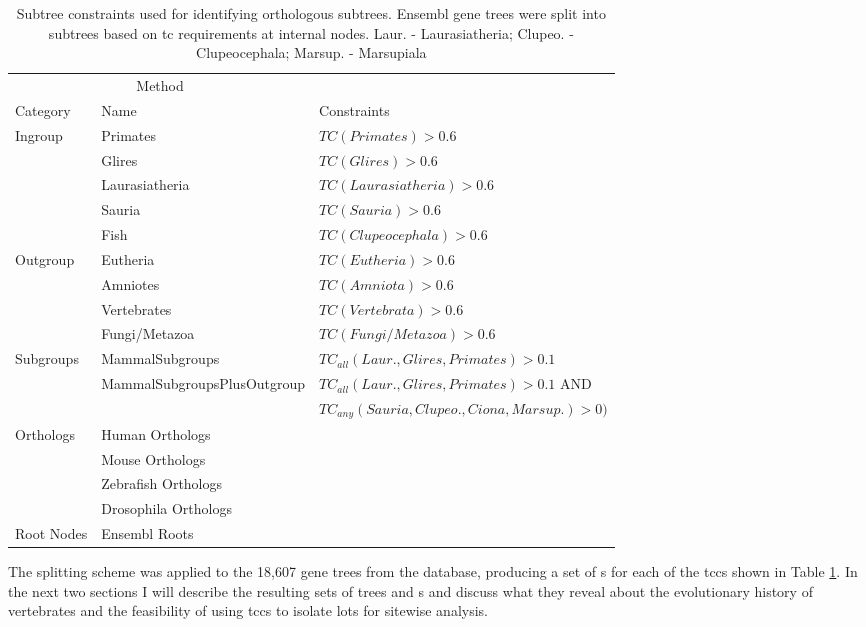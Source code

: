 \begin{table} \footnotesize
\centering
\begin{tabular}{@{}lll@{}} \toprule
\multicolumn{2}{c}{Method} \\ \cmidrule(r){1-2}
   Category & Name & Constraints \\ \midrule
Ingroup & Primates & $TC(Primates) > 0.6$ \\
 &   Glires &  $TC(Glires) > 0.6$ \\
 &   Laurasiatheria & $TC(Laurasiatheria) > 0.6$ \\
 &   Sauria & $TC(Sauria) > 0.6$ \\
 &   Fish & $TC(Clupeocephala) > 0.6$ \\
Outgroup &  Eutheria & $TC(Eutheria) > 0.6$ \\
 &   Amniotes & $TC(Amniota) > 0.6$\\
 &   Vertebrates & $TC(Vertebrata) > 0.6$\\
 &   Fungi/Metazoa & $TC(Fungi/Metazoa) > 0.6$\\
Subgroups &  MammalSubgroups & $TC_{all}(Laur., Glires, Primates) > 0.1$\\
 &   \scriptsize{MammalSubgroupsPlusOutgroup} & $TC_{all}(Laur., Glires, Primates) > 0.1$ AND \\
 &    & $TC_{any}(Sauria, Clupeo., Ciona, Marsup.) > 0)$ \\
Orthologs & Human Orthologs & \\
 &   Mouse Orthologs &  \\
 &   Zebrafish Orthologs &  \\
 &   Drosophila Orthologs &  \\
Root Nodes & Ensembl Roots &  \\
\bottomrule
\end{tabular}
\caption{Subtree constraints used for identifying \euth
  orthologous subtrees. Ensembl gene trees were split into subtrees
  based on \acf{tc} requirements at internal
  nodes. Laur. - Laurasiatheria; Clupeo. - Clupeocephala; Marsup. -
  Marsupiala}
\label{subtree_constraints}
\end{table}

The \subtr{} splitting scheme was applied to the 18,607 gene trees
from the \cmp database, producing a set of \subtr{}s for each of the
\acp{tcc} shown in Table \ref{subtree_constraints}. In the next two
sections I will describe the resulting sets of trees and \subtr{}s and
discuss what they reveal about the evolutionary history of vertebrates
and the feasibility of using \acp{tcc} to isolate \mammln \acp{lot} for
sitewise analysis.

